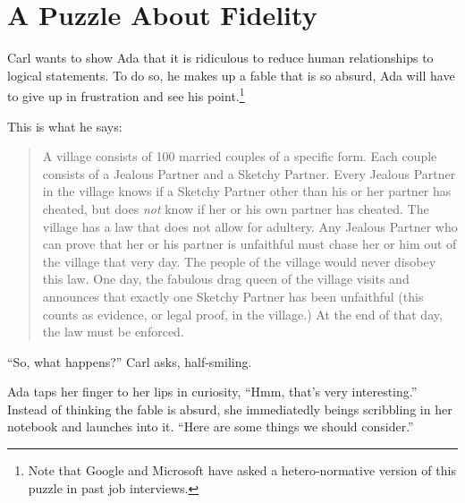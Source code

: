 \documentclass{article}
\begin{document}
\section{A Puzzle About Fidelity}

Carl wants to show Ada that it is ridiculous to reduce human
relationships to logical statements. To do so, he makes up a
fable that is so absurd, Ada will have to give up in frustration
and see his point.\footnote{Note that Google and Microsoft have
asked a hetero-normative version of this puzzle in past job
interviews.}

This is what he says:

\begin{quote}
A village consists of 100 married couples of a specific form.
Each couple consists of a Jealous Partner and a Sketchy
Partner.
Every Jealous Partner in the village knows if
a Sketchy Partner other than his or her partner has cheated, but does \emph{not}
know if her or his own partner has cheated.
The village has a law that does not allow for adultery.
Any Jealous Partner who can prove that her or his partner
is unfaithful must chase her or him out of
the village that very day.
The people of the village would never disobey this law.
One day, the fabulous drag queen of the village visits and
announces that exactly one Sketchy Partner has been unfaithful
(this counts as evidence, or legal proof, in the village.)
At the end of that day, the law must be enforced.
\end{quote}

``So, what happens?'' Carl asks, half-smiling.

Ada taps her finger to her lips in curiosity,
``Hmm, that's very interesting.'' Instead of
thinking the fable is absurd, she immediatedly
beings scribbling in her notebook and launches
into it. ``Here are some things we should
consider.''
\end{document}
